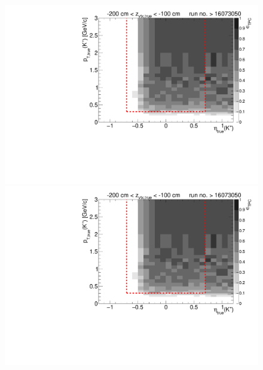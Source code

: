 \begin{figure}[hb]
{		\includegraphics[width=\linewidth,page=16]{graphics/eff/Eff2D_TPC_kaon_Plus_RunRange2.pdf}\\
		\includegraphics[width=\linewidth,page=18]{graphics/eff/Eff2D_TPC_kaon_Plus_RunRange2.pdf}
	}%
\end{figure}











